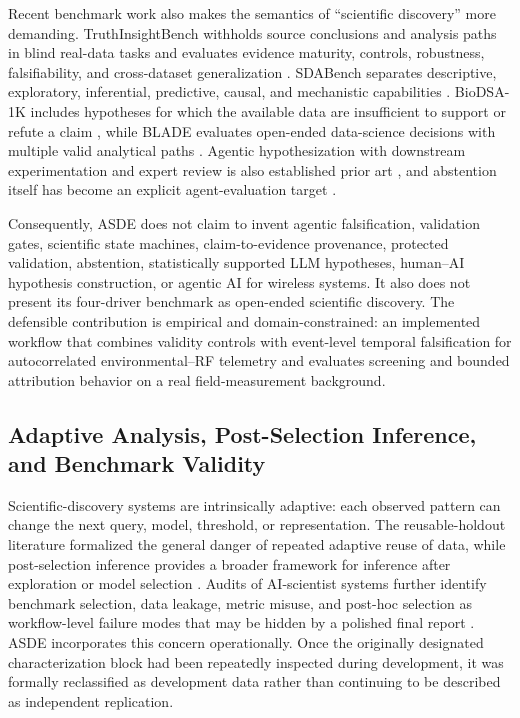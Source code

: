 \documentclass{ieeeaccess}
\begin{document}
Recent benchmark work also makes the semantics of ``scientific discovery'' more demanding. TruthInsightBench withholds source conclusions and analysis paths in blind real-data tasks and evaluates evidence maturity, controls, robustness, falsifiability, and cross-dataset generalization \cite{TRUTHINSIGHT-2026}. SDABench separates descriptive, exploratory, inferential, predictive, causal, and mechanistic capabilities \cite{SDABENCH-2026}. BioDSA-1K includes hypotheses for which the available data are insufficient to support or refute a claim \cite{BIODSA-2025}, while BLADE evaluates open-ended data-science decisions with multiple valid analytical paths \cite{BLADE-2024}. Agentic hypothesization with downstream experimentation and expert review is also established prior art \cite{EXPERIGEN-2026}, and abstention itself has become an explicit agent-evaluation target \cite{ABSTENTION-2026}.

Consequently, ASDE does not claim to invent agentic falsification, validation gates, scientific state machines, claim-to-evidence provenance, protected validation, abstention, statistically supported LLM hypotheses, human--AI hypothesis construction, or agentic AI for wireless systems. It also does not present its four-driver benchmark as open-ended scientific discovery. The defensible contribution is empirical and domain-constrained: an implemented workflow that combines validity controls with event-level temporal falsification for autocorrelated environmental--RF telemetry and evaluates screening and bounded attribution behavior on a real field-measurement background.

\subsection{Adaptive Analysis, Post-Selection Inference, and Benchmark Validity}\label{adaptive-analysis-post-selection-inference-and-benchmark-validity}

Scientific-discovery systems are intrinsically adaptive: each observed pattern can change the next query, model, threshold, or representation. The reusable-holdout literature formalized the general danger of repeated adaptive reuse of data, while post-selection inference provides a broader framework for inference after exploration or model selection \cite{REUSABLE-HOLDOUT-2015,POST-SELECTION-2022}. Audits of AI-scientist systems further identify benchmark selection, data leakage, metric misuse, and post-hoc selection as workflow-level failure modes that may be hidden by a polished final report \cite{AI-SCIENTIST-PITFALLS-2025}. ASDE incorporates this concern operationally. Once the originally designated characterization block had been repeatedly inspected during development, it was formally reclassified as development data rather than continuing to be described as independent replication.
\end{document}
